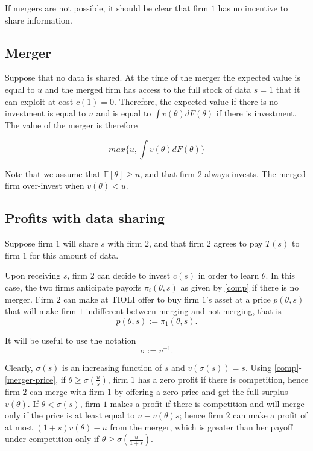 \documentclass[a4paper,leqno]{article}%
\newcommand{\E}{\mathbb E}
\renewcommand{\t}{\theta}
\newcommand{\s}{\sigma}
\begin{document}
If mergers are not possible, it should be clear that firm $1$ has no incentive to share information. 


\subsection{Merger}
%
Suppose that no data is shared. At the time of the merger the expected value is equal to $u$ and the merged firm has access to the full stock of data $s=1$ that it can exploit at cost $c(1)=0$. Therefore, the expected value if there is no investment is equal to $u$ and is equal to $\int v(\t)dF(\t)$ if there is investment. The value of the merger is therefore
%

$$max\{u,\int v(\t)dF(\t)\}$$

%
Note that we assume that $\E[\t]\geq u$, and that firm 2 always invests. The merged firm over-invest when $v(\t)<u$.

\subsection{Profits with data sharing}

Suppose firm $1$ will share $s$ with firm $2$, and that firm $2$ agrees to pay $T(s)$ to firm $1$ for this amount of data. 

Upon receiving $s$, firm $2$ can decide to invest $c(s)$ in order to learn $\t$. In this case, the two firms anticipate payoffs $\pi_i(\t,s)$ as given by \eqref{comp} if there is no merger. Firm $2$ can make at TIOLI offer to buy firm $1$'s asset at a price $p(\t,s)$ that will make firm $1$ indifferent between merging and not merging, that is 
%
\begin{equation}\label{merger-price}
    p(\t,s):=\pi_1(\t,s).  
\end{equation}
%




It will be useful to use the notation
%
\[
\s:=v^{-1}.
\]

Clearly, $\s(s)$ is an increasing function of $s$ and $v(\s(s))=s$. Using \eqref{comp}-\eqref{merger-price}, if $\t\geq \s(\frac{u}{s})$, firm $1$ has a zero profit if there is competition, hence firm $2$ can merge with firm $1$ by offering a zero price and get the full surplus $v(\t)$. If $\t< \s(s)$, firm $1$ makes a profit if there is competition and will merge only if the price is at least equal to $u-v(\t)s$; hence firm $2$ can make a profit of at most $(1+s)v(\t)-u$ from the merger, which is greater than her payoff under competition only if $\t\geq \s(\frac{u}{1+s})$. 
%
\end{document}
